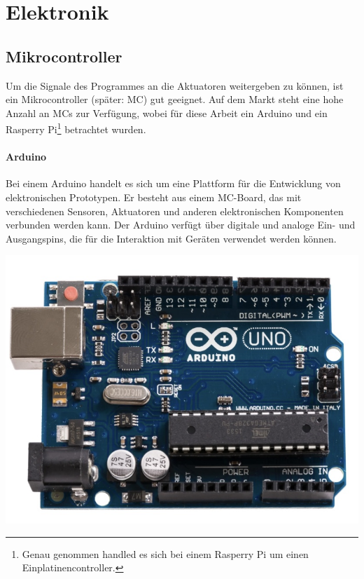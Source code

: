 \section{Elektronik}\label{konzeptionHW-elektronik}

\subsection{Mikrocontroller}\label{Ansteuerung}
Um die Signale des Programmes an die Aktuatoren weitergeben zu können, ist ein Mikrocontroller (später: \ac{MC}) gut geeignet.
Auf dem Markt steht eine hohe Anzahl an \ac{MC}s zur Verfügung,
wobei für diese Arbeit ein Arduino und ein Rasperry Pi\footnote{Genau genommen handled es sich bei einem Rasperry Pi um einen Einplatinencontroller.} betrachtet wurden.

\begin{minipage}{0.7\textwidth}
	\paragraph{Arduino}
	Bei einem Arduino handelt es sich um eine Plattform für die Entwicklung von elektronischen Prototypen. %
	Er besteht aus einem \ac{MC}-Board, das mit verschiedenen Sensoren, Aktuatoren und anderen elektronischen Komponenten verbunden werden kann.
	Der Arduino verfügt über digitale und analoge Ein- und Ausgangspins, die für die Interaktion mit Geräten verwendet werden können.
\end{minipage}
\begin{minipage}{0.3\textwidth}
	\includegraphics [width=\textwidth] {img/ArduinoR3}
\end{minipage}
\newline

